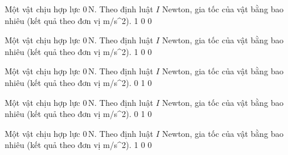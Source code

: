 

\begin{ex}
Một vật chịu hợp lực $0\,\text{N}$. Theo định luật $I$ Newton, gia tốc của vật bằng bao nhiêu (kết quả theo đơn vị m/s^2).
\choice
{}
{1}
{0}
{0}
\end{ex}

\begin{ex}
Một vật chịu hợp lực $0\,\text{N}$. Theo định luật $I$ Newton, gia tốc của vật bằng bao nhiêu (kết quả theo đơn vị m/s^2).
\choice
{1}
{}
{0}
{0}
\end{ex}

\begin{ex}
Một vật chịu hợp lực $0\,\text{N}$. Theo định luật $I$ Newton, gia tốc của vật bằng bao nhiêu (kết quả theo đơn vị m/s^2).
\choice
{0}
{1}
{}
{0}
\end{ex}

\begin{ex}
Một vật chịu hợp lực $0\,\text{N}$. Theo định luật $I$ Newton, gia tốc của vật bằng bao nhiêu (kết quả theo đơn vị m/s^2).
\choice
{0}
{1}
{0}
{}
\end{ex}

\begin{ex}
Một vật chịu hợp lực $0\,\text{N}$. Theo định luật $I$ Newton, gia tốc của vật bằng bao nhiêu (kết quả theo đơn vị m/s^2).
\choice
{}
{1}
{0}
{0}
\end{ex}


